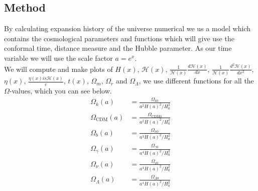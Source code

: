 \documentclass{article}
\begin{document}
\begin{multicols}{2}
\section{Method}
By calculating expansion history of the universe numerical we us a model which contains the cosmological parameters and functions which will give use the conformal time, distance measure and the Hubble parameter. As our time variable we will use the scale factor $a=e^{x}$.   
\\
We will compute and make plots of $H(x)$, $\mathcal{H}(x)$, $\frac{1}{\mathcal{H}(x)}\frac{d\mathcal{H}(x)}{dx}$, $\frac{1}{\mathcal{H}(x)}\frac{d^2\mathcal{H}(x)}{dx^2}$, $\eta(x)$, $\frac{\eta(x) is \mathcal{H}(x)}{c}$, $t(x)$, $\Omega_m$, $\Omega_r$ and $\Omega_\Lambda$, we use different functions for all the $\Omega$-values, which you can see below. 
\begin{align}
    \Omega_{k}(a)&=\frac{\Omega_{k0}}{a^2H(a)^2/H_0^2} \label{eq:Omega_k}\\
    \Omega_{\text{CDM}}(a)&=\frac{\Omega_{\text{CDM}0}}{a^2H(a)^2/H_0^2} \label{eq:Omega_CDM}\\
    \Omega_{b}(a)&=\frac{\Omega_{n0}}{a^3H(a)^2/H_0^2} \label{eq:Omega_b}\\
    \Omega_{\gamma}(a)&=\frac{\Omega_{\gamma0}}{a^4H(a)^2/H_0^2} \label{eq:Omega_gamma}\\
    \Omega_{\nu}(a)&=\frac{\Omega_{\nu0}}{a^4H(a)^2/H_0^2} \label{eq:Omega_nu}\\
    \Omega_{\Lambda}(a)&=\frac{\Omega_{\Lambda0}}{a^4H(a)^2/H_0^2} \label{eq:Omega_lambda}
\end{align}

\end{multicols}
\end{document}
